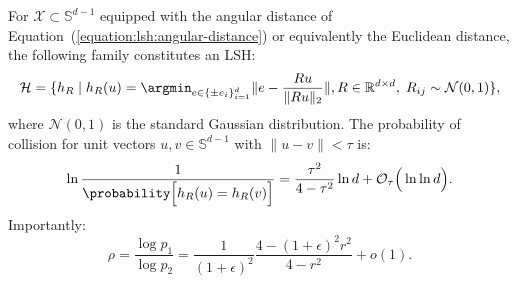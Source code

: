 \begin{theorem}
    For $\mathcal{X} \subset \mathbb{S}^{d-1}$ equipped with the angular distance of
    Equation~(\ref{equation:lsh:angular-distance}) or equivalently the Euclidean distance,
    the following family constitutes an LSH:
    \begin{equation*}
        \mathcal{H} = \{ h_R \;|\; h_R(u) = \argmin_{e \in \{ \pm e_i \}_{i=1}^d} \lVert e - \frac{Ru}{\lVert R u \rVert_2} \rVert, R \in \mathbb{R}^{d \times d},\; R_{ij} \sim \mathcal{N}(0, 1) \},
    \end{equation*}
    where $\mathcal{N}(0, 1)$ is the standard Gaussian distribution.
    The probability of collision for unit vectors $u, v \in \mathbb{S}^{d-1}$ with $\lVert u - v \rVert < \tau$ is:
    \begin{equation*}
        \ln \frac{1}{\probability\Big[ h_R(u) = h_R(v) \Big]} = \frac{\tau^2}{4 - \tau^2} \ln d + \mathcal{O}_\tau\Big( \ln \ln d \Big).
    \end{equation*}
    Importantly:
    \begin{equation*}
        \rho = \frac{\log p_1}{\log p_2} = \frac{1}{(1 + \epsilon)^2} \frac{4 - (1 + \epsilon)^2 r^2}{4 - r^2} + o(1).
    \end{equation*}
\end{theorem}
